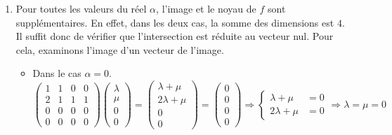 \begin{enumerate}
\begin{enumerate}
\item Pour toutes les valeurs du réel  $\alpha$, l'image et le noyau de $f$ sont suppl\'{e}mentaires. En effet, dans les deux cas, la somme des dimensions est $4$. Il suffit donc de vérifier que l'intersection est réduite au vecteur nul. Pour cela, examinons l'image d'un vecteur de l'image.
\begin{itemize}
 \item Dans le cas $\alpha=0$. 
\begin{displaymath}
 \begin{pmatrix}
  1 & 1 & 0 & 0 \\ 2 & 1 & 1 & 1 \\ 0 & 0 & 0 & 0\\ 0 & 0 & 0 & 0 
 \end{pmatrix}
\begin{pmatrix}
 \lambda \\ \mu \\ 0 \\ 0
\end{pmatrix}
=
\begin{pmatrix}
  \lambda + \mu \\ 2\lambda + \mu \\ 0 \\ 0
\end{pmatrix}
=
\begin{pmatrix}
 0 \\ 0 \\ 0 \\ 0
\end{pmatrix}
\Rightarrow
\left\lbrace 
\begin{aligned}
 \lambda + \mu &= 0 \\ 2\lambda + \mu &= 0 
\end{aligned}
\right. 
\Rightarrow \lambda = \mu = 0
\end{displaymath}


\end{itemize}
\end{enumerate}
\end{enumerate}
